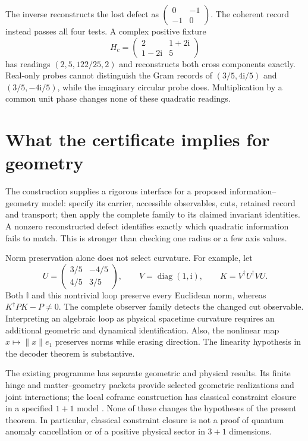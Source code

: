 \documentclass[11pt,a4paper]{article}
\newcommand{\adj}{\dagger}
\newcommand{\ii}{\mathrm{i}}
\newcommand{\Id}{\mathbb I}
\newcommand{\diag}{\operatorname{diag}}
\begin{document}
The inverse reconstructs the lost defect as
$\left(\begin{smallmatrix}0&-1\\-1&0\end{smallmatrix}\right)$.
The coherent record instead passes all four tests. A complex positive
fixture
\[
H_c=\begin{pmatrix}2&1+2\ii\\1-2\ii&5\end{pmatrix}
\]
has readings $(2,5,122/25,2)$ and reconstructs both cross components
exactly. Real-only probes cannot distinguish the Gram records of
$(3/5,4\ii/5)$ and $(3/5,-4\ii/5)$, while the imaginary circular probe
does. Multiplication by a common unit phase changes none of these
quadratic readings.

\section{What the certificate implies for geometry}

The construction supplies a rigorous interface for a proposed
information--geometry model: specify its carrier, accessible observables,
cuts, retained record and transport; then apply the complete family to its
claimed invariant identities. A nonzero reconstructed defect identifies
exactly which quadratic information fails to match. This is stronger than
checking one radius or a few axis values.

Norm preservation alone does not select curvature. For example, let
\begin{equation}
U=\begin{pmatrix}3/5&-4/5\\4/5&3/5\end{pmatrix},\qquad
V=\diag(1,\ii),\qquad K=V^\adj U^\adj VU.
\end{equation}
Both $\Id$ and this nontrivial loop preserve every Euclidean norm, whereas
$K^\adj P K-P\neq0$. The complete observer family detects the changed
cut observable. Interpreting an algebraic loop as physical spacetime
curvature requires an additional geometric and dynamical identification.
Also, the nonlinear map $x\mapsto\|x\|e_1$ preserves norms while erasing
direction. The linearity hypothesis in the decoder theorem is substantive.

The existing programme has separate geometric and physical results. Its
finite hinge and matter--geometry packets provide selected geometric
realizations and joint interactions; the local coframe construction has
classical constraint closure in a specified $1+1$ model \cite{record,lnc}.
None of these changes the hypotheses of the present theorem. In particular,
classical constraint closure is not a proof of quantum anomaly cancellation
or of a positive physical sector in $3+1$ dimensions.
\end{document}
